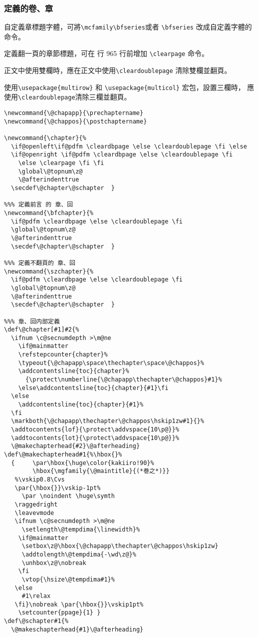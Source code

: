 \subsubsection{定義的卷、章}

\par 自定義章標題字體，可將\verb+\mcfamily\bfseries+或者 \verb+\bfseries+
改成自定義字體的命令。
\par 定義翻一頁的章節標題，可在 行 965 行前增加 \verb+\clearpage+ 命令。
\par 正文中使用雙欄時，應在正文中使用\verb+\cleardoublepage+ 清除雙欄並翻頁。
\par 使用\verb+\usepackage{multirow}+ 和 \verb+\usepackage{multicol}+ 宏包，設置三欄時，
應使用\verb+\cleardoublepage+清除三欄並翻頁。
\begin{lstlisting}[firstnumber=927]
%%% 定義的 章、回
\newcommand{\@chapapp}{\prechaptername}
\newcommand{\@chappos}{\postchaptername}

\newcommand{\chapter}{%
  \if@openleft\if@pdfm \cleardbpage \else \cleardoublepage \fi \else
  \if@openright \if@pdfm \cleardbpage \else \cleardoublepage \fi
    \else \clearpage \fi \fi
    \global\@topnum\z@
    \@afterindenttrue
  \secdef\@chapter\@schapter  }

%%% 定義前言 的 章、回
\newcommand{\bfchapter}{%
  \if@pdfm \cleardbpage \else \cleardoublepage \fi
  \global\@topnum\z@
  \@afterindenttrue
  \secdef\@chapter\@schapter  }

%%% 定義不翻頁的 章、回
\newcommand{\szchapter}{%
  \if@pdfm \cleardbpage \else \cleardoublepage \fi
  \global\@topnum\z@
  \@afterindenttrue
  \secdef\@chapter\@schapter  }

%%% 章、回内部定義
\def\@chapter[#1]#2{%
  \ifnum \c@secnumdepth >\m@ne
    \if@mainmatter
    \refstepcounter{chapter}%
    \typeout{\@chapapp\space\thechapter\space\@chappos}%
    \addcontentsline{toc}{chapter}%
      {\protect\numberline{\@chapapp\thechapter\@chappos}#1}%
    \else\addcontentsline{toc}{chapter}{#1}\fi
  \else
    \addcontentsline{toc}{chapter}{#1}%
  \fi
  \markboth{\@chapapp\thechapter\@chappos\hskip1zw#1}{}%
  \addtocontents{lof}{\protect\addvspace{10\p@}}%
  \addtocontents{lot}{\protect\addvspace{10\p@}}%
  \@makechapterhead{#2}\@afterheading}
\def\@makechapterhead#1{%\hbox{}%
  {     \par\hbox{\huge\color{kakiiro!90}%
        \hbox{\mgfamily{\@maintitle}{(*巻之*)}}
   %\vskip0.8\Cvs
   \par{\hbox{}}\vskip-1pt%
     \par \noindent \huge\symth
   \raggedright
   \leavevmode
   \ifnum \c@secnumdepth >\m@ne
     \setlength\@tempdima{\linewidth}%
    \if@mainmatter
     \setbox\z@\hbox{\@chapapp\thechapter\@chappos\hskip1zw}
     \addtolength\@tempdima{-\wd\z@}%
     \unhbox\z@\nobreak
    \fi
     \vtop{\hsize\@tempdima#1}%
   \else
     #1\relax
   \fi}\nobreak \par{\hbox{}}\vskip1pt%
    \setcounter{ppage}{1} }
\def\@schapter#1{%
  \@makeschapterhead{#1}\@afterheading}


\end{lstlisting}
